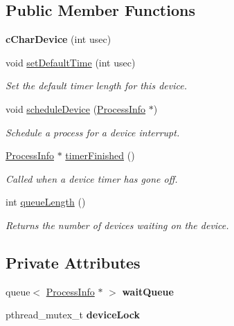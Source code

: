 \subsection*{\-Public \-Member \-Functions}
\begin{DoxyCompactItemize}
\item 
\hypertarget{classcCharDevice_a2b47487b6c2f6b918281afae840158a4}{{\bfseries c\-Char\-Device} (int usec)}\label{d9/de9/classcCharDevice_a2b47487b6c2f6b918281afae840158a4}

\item 
void \hyperlink{classcCharDevice_a62b7bd4cb53a35f70798ec18d0340c1e}{set\-Default\-Time} (int usec)
\begin{DoxyCompactList}\small\item\em \-Set the default timer length for this device. \end{DoxyCompactList}\item 
void \hyperlink{classcCharDevice_a8378acae0c295100795877bc316fe1a5}{schedule\-Device} (\hyperlink{structProcessInfo}{\-Process\-Info} $\ast$)
\begin{DoxyCompactList}\small\item\em \-Schedule a process for a device interrupt. \end{DoxyCompactList}\item 
\hyperlink{structProcessInfo}{\-Process\-Info} $\ast$ \hyperlink{classcCharDevice_a5d3c8f17cda6545aa1ddf6489c720168}{timer\-Finished} ()
\begin{DoxyCompactList}\small\item\em \-Called when a device timer has gone off. \end{DoxyCompactList}\item 
\hypertarget{classcCharDevice_ae62be6259f092713317c69f4ca385f72}{int \hyperlink{classcCharDevice_ae62be6259f092713317c69f4ca385f72}{queue\-Length} ()}\label{d9/de9/classcCharDevice_ae62be6259f092713317c69f4ca385f72}

\begin{DoxyCompactList}\small\item\em \-Returns the number of devices waiting on the device. \end{DoxyCompactList}\end{DoxyCompactItemize}
\subsection*{\-Private \-Attributes}
\begin{DoxyCompactItemize}
\item 
\hypertarget{classcCharDevice_a47c60dbc03d8ba343d42e99e0c5c1317}{queue$<$ \hyperlink{structProcessInfo}{\-Process\-Info} $\ast$ $>$ {\bfseries wait\-Queue}}\label{d9/de9/classcCharDevice_a47c60dbc03d8ba343d42e99e0c5c1317}

\item 
\hypertarget{classcCharDevice_a449c978d56ce1bd377fc4ead7abf362f}{pthread\-\_\-mutex\-\_\-t {\bfseries device\-Lock}}\label{d9/de9/classcCharDevice_a449c978d56ce1bd377fc4ead7abf362f}

\end{DoxyCompactItemize}



